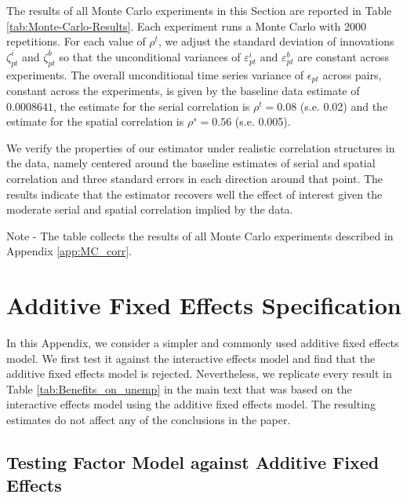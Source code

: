 \documentclass[12pt]{article}
\newcommand{\1}{\mathbf{1}}
\begin{document}
\begin{appendix}
The results of all Monte Carlo experiments in this Section are reported in Table \ref{tab:Monte-Carlo-Results}. Each experiment runs a Monte Carlo with 2000 repetitions. For each value of $\rho^{t}$, we adjust the standard deviation of innovations $\zeta_{pt}^{i}$ and $\zeta_{pt}^{b}$ so that the unconditional variances of $\varepsilon_{pt}^{i}$ and $\varepsilon_{pt}^{b}$ are constant across experiments. The overall unconditional time series variance of $\epsilon_{pt}$ across pairs, constant across the experiments, is given by the baseline data estimate of $0.0008641$, the estimate for the serial correlation is $\rho^{t}=0.08$ (s.e. 0.02) and the estimate for the spatial correlation is $\rho^{s}=0.56$ (s.e. 0.005).

We verify the properties of our estimator under realistic correlation structures in the data, namely centered around the baseline estimates of serial and spatial correlation and three standard errors in each direction around that point. The results indicate that the estimator recovers well the effect of interest given the moderate serial and spatial correlation implied by the data.


\begin{table}[t]
\caption{Monte Carlo Results}
\label{tab:Monte-Carlo-Results}
\centering{}%

\parbox{13.0cm}{\noindent \footnotesize Note - The table collects the results of all Monte Carlo experiments described in Appendix \ref{app:MC_corr}.}
\end{table}





\clearpage
\section{Additive Fixed Effects Specification}
\label{app:OLS}
In this Appendix, we consider a simpler and commonly used additive fixed effects model. We first test it against the interactive effects model and find that the additive fixed effects model is rejected. Nevertheless, we replicate every result in Table \ref{tab:Benefits_on_unemp} in the main text that was based on the interactive effects model using the additive fixed effects model. The resulting estimates do not affect any of the conclusions in the paper.


\subsection{Testing Factor Model against Additive Fixed Effects}


\end{appendix}
\end{document}
